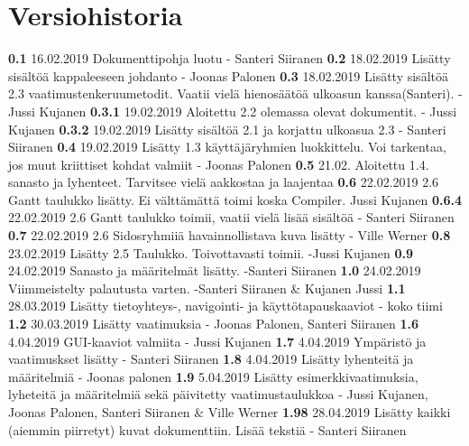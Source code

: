 \chapter*{Versiohistoria}

\newcommand{\currentversion}{1.98} %

\textbf{0.1} 16.02.2019 Dokumenttipohja luotu - Santeri Siiranen \newline
\textbf{0.2} 18.02.2019 Lisätty sisältöä kappaleeseen johdanto - Joonas Palonen \newline
\textbf{0.3} 18.02.2019 Lisätty sisältöä 2.3 vaatimustenkeruumetodit. Vaatii vielä hienosäätöä ulkoasun kanssa(Santeri). - Jussi Kujanen \newline
\textbf{0.3.1} 19.02.2019 Aloitettu 2.2 olemassa olevat dokumentit. - Jussi Kujanen \newline
\textbf{0.3.2} 19.02.2019 Lisätty sisältöä 2.1 ja korjattu ulkoasua 2.3 - Santeri Siiranen \newline
\textbf{0.4} 19.02.2019 Lisätty 1.3 käyttäjäryhmien luokkittelu. Voi tarkentaa, jos muut kriittiset kohdat valmiit - Joonas Palonen \newline
\textbf{0.5} 21.02. Aloitettu 1.4. sanasto ja lyhenteet. Tarvitsee vielä aakkostaa ja laajentaa \newline
\textbf{0.6} 22.02.2019 2.6 Gantt taulukko lisätty. Ei välttämättä toimi koska Compiler. Jussi Kujanen \newline
\textbf{0.6.4} 22.02.2019 2.6 Gantt taulukko toimii, vaatii vielä lisää sisältöä - Santeri Siiranen \newline
\textbf{0.7} 22.02.2019 2.6 Sidosryhmiiä havainnollistava kuva lisätty - Ville Werner \newline
\textbf{0.8} 23.02.2019 Lisätty 2.5 Taulukko. Toivottavasti toimii. -Jussi Kujanen \newline
\textbf{0.9} 24.02.2019 Sanasto ja määritelmät lisätty. -Santeri Siiranen \newline
\textbf{1.0} 24.02.2019 Viimmeistelty palautusta varten. -Santeri Siiranen \& Kujanen Jussi \newline 
\textbf{1.1} 28.03.2019 Lisätty tietoyhteys-, navigointi- ja käyttötapauskaaviot - koko tiimi \newline
\textbf{1.2} 30.03.2019 Lisätty vaatimuksia - Joonas Palonen, Santeri Siiranen\newline 
\textbf{1.6} 4.04.2019 GUI-kaaviot valmiita - Jussi Kujanen\newline 
\textbf{1.7} 4.04.2019 Ympäristö ja vaatimuskset lisätty - Santeri Siiranen\newline 
\textbf{1.8} 4.04.2019 Lisätty lyhenteitä ja määritelmiä - Joonas palonen\newline 
\textbf{1.9} 5.04.2019 Lisätty esimerkkivaatimuksia, lyheteitä ja määritelmiä sekä päivitetty vaatimustaulukkoa - Jussi Kujanen, Joonas Palonen, Santeri Siiranen \& Ville Werner \newline 
\textbf{1.98} 28.04.2019 Lisätty kaikki (aiemmin piirretyt) kuvat dokumenttiin. Lisää tekstiä - Santeri Siiranen \newline 
